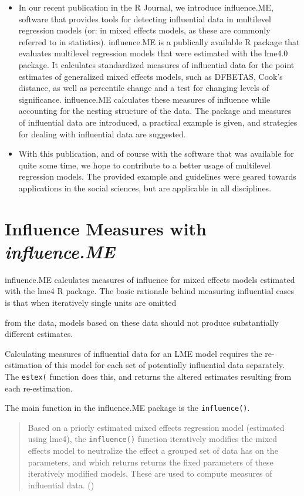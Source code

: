 \documentclass[12pt, a4paper]{article}
\begin{document}
\begin{itemize}
	\item In our recent publication in the R Journal, we introduce influence.ME, software that provides tools for detecting influential data in multilevel regression models (or: in mixed effects models, as these are commonly referred to in statistics). influence.ME is a publically available R package that evaluates multilevel regression models that were estimated with the lme4.0 package. It calculates standardized measures of influential data for the point estimates of generalized mixed effects models, such as DFBETAS, Cook’s distance, as well as percentile change and a test for changing levels of significance. influence.ME calculates these measures of influence while accounting for the nesting structure of the data. The package and measures of influential data are introduced, a practical example is given, and strategies for dealing with influential data are suggested.
	
	\item With this publication, and of course with the software that was available for quite some time, we hope to contribute to a better usage of multilevel regression models. The provided example and guidelines were geared towards applications in the social sciences, but are applicable in all disciplines.
\end{itemize}


\newpage
\section*{Influence Measures with \textit{influence.ME}}influence.ME calculates measures of influence for mixed effects models estimated with the lme4 R package. The
basic rationale behind measuring influential cases is that when iteratively single units are omitted

from the data, models based on these data should not produce substantially different estimates. 

Calculating measures of influential data for an LME model requires the re-estimation
of this model for each set of potentially influential data separately. The \texttt{estex(} function does this,
and returns the altered estimates resulting from each re-estimation. 

The main function in the influence.ME package is the \texttt{influence()}.

\begin{quote} Based on a priorly estimated
	mixed effects regression model (estimated using lme4), the \texttt{influence()} function iteratively modifies
	the mixed effects model to neutralize the effect a grouped set of data has on the parameters, and
	which returns returns the fixed parameters of these iteratively modified models. These are used to
	compute measures of influential data. ()
\end{quote}
\end{document}
